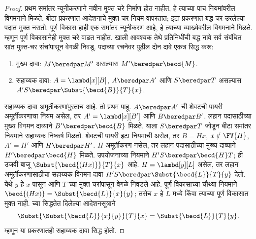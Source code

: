 \documentclass[../../../include/open-logic-section]{subfiles}
\begin{document}
\begin{proof}
प्रथम समांतर न्यूनीकरणाने नवीन मुक्त चरे निर्माण होत नाहीत,
हे त्याच्या पाच नियमांवरील विगमनाने मिळते. बीटा प्रकरणात
आदेशनाचे मुक्त-चर नियम वापरतात; इटा प्रकरणात बद्ध चर
उरलेल्या पदात मुक्त नसतो. पूर्ण विकास हाही एक समांतर
न्यूनीकरण आहे, हे त्याच्या व्याख्येवरील विगमनाने मिळते.
म्हणून पूर्ण विकासानेही मुक्त चरे वाढत नाहीत. खाली आवश्यक
तेथे प्रतिनिधींची बद्ध नावे सर्व संबंधित सांत मुक्त-चर
संचांपासून वेगळी निवडू.
पदाच्या रचनेवर पुढील दोन दावे एकत्र सिद्ध करू:
\begin{enumerate}
\item मुख्य दावा: $M\beredpar M'$ असल्यास
$M'\beredpar\becd{M}$.
\item सहाय्यक दावा: $A=\lambd[x][B]$, $A\beredpar A'$
आणि $S\beredpar T$ असल्यास
$A'S\beredpar\Subst{\becd{B}}{T}{x}$.
\end{enumerate}
सहाय्यक दावा अमूर्तीकरणांपुरताच आहे. तो प्रथम पाहू.
$A\beredpar A'$ ची शेवटची पायरी अमूर्तीकरणाचा नियम
असेल, तर $A'=\lambd[x][B']$ आणि $B\beredpar B'$.
लहान पदासाठीच्या मुख्य विगमन दाव्याने
$B'\beredpar\becd{B}$ मिळते. याला $S\beredpar T$
जोडून बीटा समांतर नियमाने सहाय्यक निष्कर्ष मिळतो.
शेवटची पायरी इटा नियमाची असेल, तर $B=Hx$,
$x\notin\FV{H}$, $A'=H'$ आणि $H\beredpar H'$.
$H$ अमूर्तीकरण नसेल, तर लहान पदासाठीच्या मुख्य दाव्याने
$H'\beredpar\becd{H}$ मिळते. उपयोजनाच्या नियमाने
$H'S\beredpar\becd{H}T$; ही उजवी बाजू
$\Subst{\becd{(Hx)}}{T}{x}$ आहे.
$H=\lambd[y][L]$ असेल, तर लहान अमूर्तीकरणासाठीचा
सहाय्यक विगमन दावा
$H'S\beredpar\Subst{\becd{L}}{T}{y}$ देतो.
येथे $y$ हे $x$ पासून आणि $T$ च्या मुक्त चरांपासून
वेगळे निवडले आहे. पूर्ण विकासाच्या चौथ्या नियमाने
$\becd{(Hx)}=\Subst{\becd{L}}{x}{y}$; तसेच $x$
हे $L$ मध्ये किंवा त्याच्या पूर्ण विकासात मुक्त नाही.
 च्या सिद्धतेत दिलेल्या आदेशनसूत्राने
\[
\Subst{\Subst{\becd{L}}{x}{y}}{T}{x}
=\Subst{\becd{L}}{T}{y}.
\]
म्हणून या प्रकरणातही सहाय्यक दावा सिद्ध होतो.


\end{proof}
\end{document}
